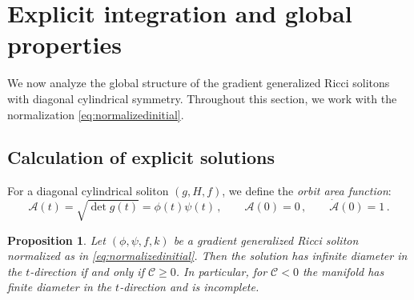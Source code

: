 \documentclass[10pt,a4paper]{amsart}
\newtheorem{proposition}{Proposition}
\newcommand{\cA}{\mathcal{A}}
\newcommand{\cC}{\mathcal{C}}
\begin{document}
\section{Explicit integration and global properties}
\label{sec:gradient generalized Ricci}

We now analyze the global structure of the gradient generalized Ricci solitons with diagonal cylindrical symmetry. Throughout this section, we work with the normalization \eqref{eq:normalizedinitial}.


\subsection{Calculation of explicit solutions}

For a diagonal cylindrical soliton $(g,H,f)$, we define the \emph{orbit area function}:
\begin{equation}\label{eq:areafunction}
\cA(t) = \sqrt{\det g(t)} = \phi(t)\psi(t) \,, \qquad \cA(0) = 0 \,, \qquad \dot{\cA}(0) = 1 \,.
\end{equation}

\begin{proposition}\label{prop:dilatonconstant}
Let $(\phi,\psi,f,k)$ be a gradient generalized Ricci soliton normalized as in \eqref{eq:normalizedinitial}. Then the solution has infinite diameter in the $t$-direction if and only if $\cC \ge 0$. In particular, for $\cC < 0$ the manifold has finite diameter in the $t$-direction and is incomplete.
\end{proposition}
\end{document}
